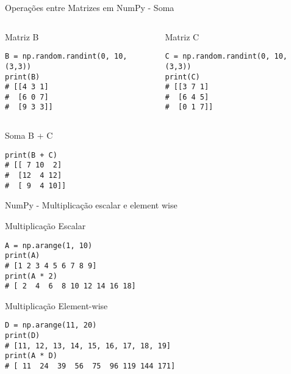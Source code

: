 \begin{frame}[fragile]{Operações entre Matrizes em NumPy - Soma}
\begin{columns}[T]
    \begin{column}{0.5\textwidth}
        \begin{block}{Matriz B}
\begin{verbatim}
B = np.random.randint(0, 10, (3,3))
print(B)
# [[4 3 1]
#  [6 0 7]
#  [9 3 3]]
\end{verbatim}
        \end{block}
\end{column}
    
    \begin{column}{0.5\textwidth}        
        \begin{block}{Matriz C}
\begin{verbatim}
C = np.random.randint(0, 10, (3,3))
print(C)
# [[3 7 1]
#  [6 4 5]
#  [0 1 7]]
\end{verbatim}
        \end{block}
    \end{column}
\end{columns}
    
   
        \begin{exampleblock}{Soma B + C}
\begin{verbatim}
print(B + C)
# [[ 7 10  2]
#  [12  4 12]
#  [ 9  4 10]]
\end{verbatim}
        \end{exampleblock}
        





\end{frame}

\begin{frame}[fragile]{NumPy - Multiplicação escalar e element wise}

        \begin{block}{Multiplicação Escalar}
\begin{verbatim}
A = np.arange(1, 10)
print(A)
# [1 2 3 4 5 6 7 8 9]
print(A * 2)
# [ 2  4  6  8 10 12 14 16 18]
\end{verbatim}
        \end{block}
        
        \begin{block}{Multiplicação Element-wise}
\begin{verbatim}
D = np.arange(11, 20)
print(D)
# [11, 12, 13, 14, 15, 16, 17, 18, 19]
print(A * D)
# [ 11  24  39  56  75  96 119 144 171]
\end{verbatim}
        \end{block}

\end{frame}

